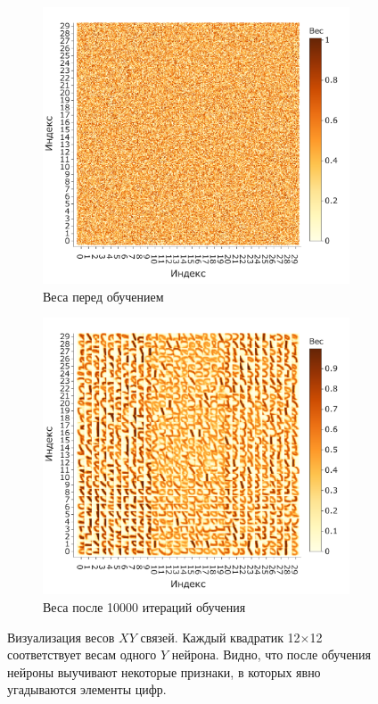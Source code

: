 \documentclass[a4paper]{article}
\begin{document}
\begin{figure}[H]
\centering
\begin{subfigure}{0.45\textwidth}
    \includegraphics[width=\textwidth,keepaspectratio=true]{weights_XY_untrained_ru.pdf}
    \caption{Веса перед обучением}
\end{subfigure}
\begin{subfigure}{0.45\textwidth}  \label{weights_XY}
    \includegraphics[width=\textwidth,keepaspectratio=true]{weights_XY_ru.pdf}
    \caption{Веса после 10000 итераций обучения}
\end{subfigure}
\caption{Визуализация весов $XY$ связей. Каждый квадратик 12$\times$12 соответствует весам одного $Y$ нейрона. Видно, что после обучения нейроны выучивают некоторые признаки, в которых явно угадываются элементы цифр.}
\end{figure}
\end{document}
